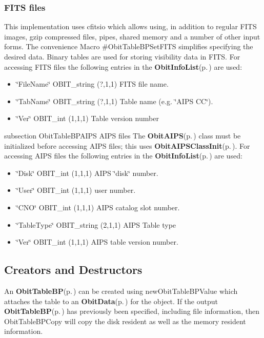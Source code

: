 \subsubsection{FITS files}\label{ObitTableWX_8h_TableFITS}
This implementation uses cfitsio which allows using, in addition to regular FITS images, gzip compressed files, pipes, shared memory and a number of other input forms. The convenience Macro \#Obit\-Table\-BPSet\-FITS simplifies specifying the desired data. Binary tables are used for storing visibility data in FITS. For accessing FITS files the following entries in the {\bf Obit\-Info\-List}{\rm (p.\,\pageref{structObitInfoList})} are used: \begin{itemize}
\item \char`\"{}File\-Name\char`\"{} OBIT\_\-string (?,1,1) FITS file name. \item \char`\"{}Tab\-Name\char`\"{} OBIT\_\-string (?,1,1) Table name (e.g. \char`\"{}AIPS CC\char`\"{}). \item \char`\"{}Ver\char`\"{} OBIT\_\-int (1,1,1) Table version number\end{itemize}
subsection Obit\-Table\-BPAIPS AIPS files The {\bf Obit\-AIPS}{\rm (p.\,\pageref{structObitAIPS})} class must be initialized before accessing AIPS files; this uses {\bf Obit\-AIPSClass\-Init}{\rm (p.\,\pageref{ObitAIPS_8c_a5})}. For accessing AIPS files the following entries in the {\bf Obit\-Info\-List}{\rm (p.\,\pageref{structObitInfoList})} are used: \begin{itemize}
\item \char`\"{}Disk\char`\"{} OBIT\_\-int (1,1,1) AIPS \char`\"{}disk\char`\"{} number. \item \char`\"{}User\char`\"{} OBIT\_\-int (1,1,1) user number. \item \char`\"{}CNO\char`\"{} OBIT\_\-int (1,1,1) AIPS catalog slot number. \item \char`\"{}Table\-Type\char`\"{} OBIT\_\-string (2,1,1) AIPS Table type \item \char`\"{}Ver\char`\"{} OBIT\_\-int (1,1,1) AIPS table version number.\end{itemize}
\subsection{Creators and Destructors}\label{ObitTableBP_8h_ObitTableBPaccess}
An {\bf Obit\-Table\-BP}{\rm (p.\,\pageref{structObitTableBP})} can be created using new\-Obit\-Table\-BPValue which attaches the table to an {\bf Obit\-Data}{\rm (p.\,\pageref{structObitData})} for the object. If the output {\bf Obit\-Table\-BP}{\rm (p.\,\pageref{structObitTableBP})} has previously been specified, including file information, then Obit\-Table\-BPCopy will copy the disk resident as well as the memory resident information.

